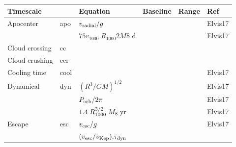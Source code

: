 \documentclass[11pt]{article}
\begin{document}
\begin{table}
  \begin{center}
    \begin{tabular}{l l l l l l} 
      \hline
      \hline 
      Timescale     &          & Equation                                                                                                         & Baseline& Range& Ref \\
      \hline  
      \hline 
      Apocenter            & apo     & $v_{\rm radial}/g$                                                                                     &            &             & Elvis17\\
                                  &             &    $75 v_{1000}. R_{1000} 2 M8$ d                                                             & & & Elvis17\\ 
      Cloud crossing    &  cc         &    & & & \\
      Cloud crushing    & ccr       &     & & & \\
      Cooling time       & cool      &    & & & Elvis17\\
      Dynamical            & dyn    & $(R^3/GM)^{1/2}$                                                                                                 &   & & Elvis17\\
                                   &          & $P_{\rm orb}/2\pi$                                                                                                 &   & & Elvis17\\
                                   &           & $1.4 \; R_{1000}^{3/2} \; M_{8} \; {\rm yr}$                                                             &   & & Elvis17\\
      Escape                 &  esc  &  $v_{\rm esc} / g$                                                                                                         & & & Elvis17\\
                                  &          & $(v_{\rm esc} / v_{\rm Kep}) . \tau_{\rm dyn} $       & & & \\

\end{tabular}
\end{center}
\end{table}
\end{document}
